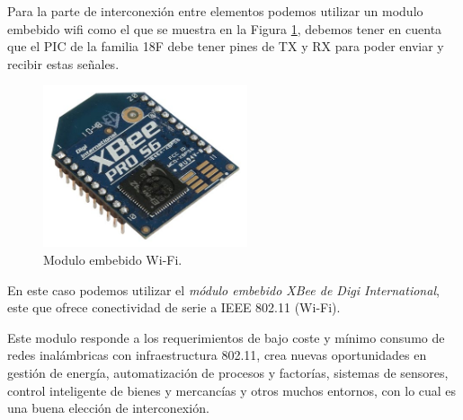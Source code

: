 Para la parte de interconexión entre elementos podemos utilizar un modulo embebido wifi como el que se muestra en la Figura \ref{wifi}, debemos tener en cuenta que el PIC de la familia 18F debe tener pines de TX y RX para poder enviar y recibir estas señales.
\begin{figure}[H]
   	\centering
		\includegraphics[width=6cm]{imag/wifi.jpg}
		\caption{Modulo embebido Wi-Fi.}
		\label{wifi}
\end{figure}

En este caso podemos utilizar el \textit{módulo embebido XBee de Digi International}, este que ofrece conectividad de serie a IEEE 802.11 (Wi-Fi).\newline

Este modulo responde a los requerimientos de bajo coste y mínimo consumo de redes inalámbricas con infraestructura 802.11, crea nuevas oportunidades en gestión de energía, automatización de procesos y factorías, sistemas de sensores, control inteligente de bienes y mercancías y otros muchos entornos, con lo cual es una buena elección de interconexión.



